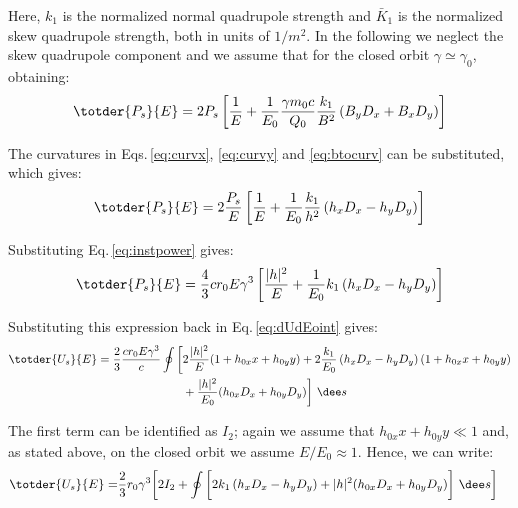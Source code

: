 Here, $k_1$ is the normalized normal quadrupole strength and $\bar{K}_1$ is the normalized skew quadrupole strength, both in units of $1/m^2$. In the following we neglect the skew quadrupole component and we assume that for the closed orbit $\gamma\simeq\gamma_0$, obtaining:
\begin{equation}
    \totder{P_s}{E} = 2 P_s \left[ \frac{1}{E} + \frac{1}{E_0} \frac{\gamma m_0 c}{Q_0} \frac{k_1}{B^2} \left( B_y D_x + B_x D_y \right) \right]
\end{equation}

The curvatures in Eqs.\,\eqref{eq:curvx}, \eqref{eq:curvy} and \eqref{eq:btocurv} can be substituted, which gives:
\begin{equation}
    \totder{P_s}{E}
    = 2 \frac{P_s}{E} \left[ \frac{1}{E} + \frac{1}{E_0} \frac{k_1}{h^2} \left( h_x D_x - h_y D_y \right) \right]
    \label{eq:dPdE}
\end{equation}

Substituting Eq.\,\eqref{eq:instpower} gives:
\begin{equation}
    \totder{P_s}{E}
    = \frac{4}{3} c r_0 E \gamma^3  \left[ \frac{|h|^2}{E} + \frac{1}{E_0} k_1 \left( h_x D_x - h_y D_y \right) \right]
\end{equation}

Substituting this expression back in Eq.\,\eqref{eq:dUdEoint} gives:
\begin{align}
    \totder{U_s}{E} = \frac{2}{3} \frac{c r_0 E \gamma^3}{c} \oint \bigg[ &2\frac{|h|^2}{E}(1 + h_{0x}x + h_{0y}y) +
    2\frac{k_1}{E_0} \left( h_x D_x - h_y D_y \right)(1 + h_{0x}x + h_{0y}y) \notag\\ &+ \frac{|h|^2}{E_0} (h_{0x}D_x + h_{0y} D_y)\bigg] \ \dee s
\end{align}

The first term can be identified as $I_2$; again we assume that $h_{0x}x + h_{0y}y \ll 1$ and, as stated above, on the closed orbit we assume $E/E_0 \approx 1$. Hence, we can write:
\begin{align}
    \totder{U_s}{E} = &\frac{2}{3} r_0 \gamma^3 \bigg[2I_2
    + \oint \bigg[2k_1 \left( h_x D_x - h_y D_y \right) + |h|^2 (h_{0x}D_x + h_{0y} D_y)\bigg] \ \dee s \bigg]
\end{align}

